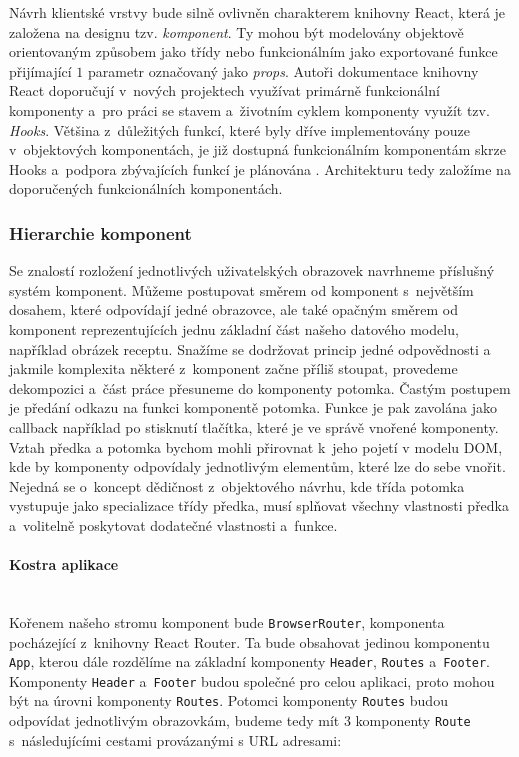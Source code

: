 Návrh klientské vrstvy bude silně ovlivněn charakterem knihovny React, která je založena na designu tzv. \emph{komponent}. Ty mohou být modelovány objektově orientovaným způsobem jako třídy nebo funkcionálním jako exportované funkce přijímající $1$ parametr označovaný jako \emph{props}. Autoři dokumentace knihovny React doporučují v~nových projektech využívat primárně funkcionální komponenty a~pro práci se stavem a~životním cyklem komponenty využít tzv. \emph{Hooks}. Většina z~důležitých funkcí, které byly dříve implementovány pouze v~objektových komponentách, je již dostupná funkcionálním komponentám skrze Hooks a~podpora zbývajících funkcí je plánována \citep{class-or-functional}. Architekturu tedy založíme na doporučených funkcionálních komponentách.

\subsubsection{Hierarchie komponent}

Se znalostí rozložení jednotlivých uživatelských obrazovek navrhneme příslušný systém komponent. Můžeme postupovat směrem od komponent s~největším dosahem, které odpovídají jedné obrazovce, ale také opačným směrem od komponent reprezentujících jednu základní část našeho datového modelu, například obrázek receptu. Snažíme se dodržovat princip jedné odpovědnosti a jakmile komplexita některé z~komponent začne příliš stoupat, provedeme dekompozici a~část práce přesuneme do komponenty potomka. Častým postupem je předání odkazu na funkci komponentě potomka. Funkce je pak zavolána jako callback například po stisknutí tlačítka, které je ve správě vnořené komponenty. Vztah předka a potomka bychom mohli přirovnat k~jeho pojetí v modelu DOM, kde by komponenty odpovídaly jednotlivým elementům, které lze do sebe vnořit. Nejedná se o~koncept dědičnost z~objektového návrhu, kde třída potomka vystupuje jako specializace třídy předka, musí splňovat všechny vlastnosti předka a~volitelně poskytovat dodatečné vlastnosti a~funkce.

\paragraph{Kostra aplikace}\mbox{}\\

Kořenem našeho stromu komponent bude \texttt{BrowserRouter}, komponenta pocházející z~knihovny React Router. Ta bude obsahovat jedinou komponentu \texttt{App}, kterou dále rozdělíme na základní komponenty \texttt{Header}, \texttt{Routes} a~\texttt{Footer}. Komponenty \texttt{Header} a~\texttt{Footer} budou společné pro celou aplikaci, proto mohou být na úrovni komponenty \texttt{Routes}. Potomci komponenty \texttt{Routes} budou odpovídat jednotlivým obrazovkám, budeme tedy mít $3$ komponenty \texttt{Route} s~následujícími cestami provázanými s URL adresami:

